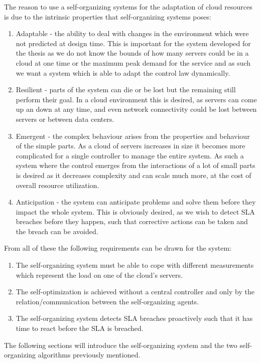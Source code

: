The reason to use a self-organizing systems for the adaptation of cloud resources is due to the intrinsic properties that self-organizing systems poses:
\begin{enumerate}
	\item Adaptable - the ability to deal with changes in the environment which were not predicted at design time. This is important for the system developed for the thesis as we do not know the bounds of how many servers could be in a cloud at one time or the maximum peak demand for the service and as such we want a system which is able to adapt the control law dynamically.
	\item Resilient - parts of the system can die or be lost but the remaining still perform their goal. In a cloud environment this is desired, as servers can come up an down at any time, and even network connectivity could be lost between servers or between data centers.
	\item Emergent - the complex behaviour arises from the properties and behaviour of the simple parts. As a cloud of servers increases in size it becomes more complicated for a single controller to manage the entire system. As such a system where the control emerges from the interactions of a lot of small parts is desired as it decreases complexity and can scale much more, at the cost of overall resource utilization.
	\item Anticipation - the system can anticipate problems and solve them before they impact the whole system. This is obviously desired, as we wish to detect SLA breaches before they happen, such that corrective actions can be taken and the breach can be avoided.
\end{enumerate}

From all of these the following requirements can be drawn for the system:

\begin{enumerate}
	\item The self-organizing system must be able to cope with different measurements which represent the load on one of the cloud's servers.
	\item The self-optimization is achieved without a central controller and only by the relation/communication between the self-organizing agents.
	\item The self-organizing system detects SLA breaches proactively such that it has time to react before the SLA is breached.
\end{enumerate}

The following sections will introduce the self-organizing system and the two self-organizing algorithms previously mentioned.

